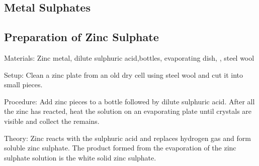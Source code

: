 \begin{multicols}{2}



\section*{Metal Sulphates}


\subsection{Preparation of Zinc Sulphate}


\begin{description*}
\item[Materials:]{Zinc metal, dilute sulphuric acid,bottles, evaporating dish, , steel wool}
\item[Setup:]{Clean a zinc plate from an old dry cell using steel wool and cut it into small pieces.}
\item[Procedure:]{Add zinc pieces to a bottle followed by dilute sulphuric acid. After all the zinc has reacted, heat the solution on an evaporating plate until crystals are visible and collect the remains.}
\item[Theory:]{Zinc reacts with the sulphuric acid and replaces hydrogen gas and form soluble zinc sulphate. The product formed from the evaporation of the zinc
sulphate solution is the white solid zinc sulphate.}
\end{description*}


\end{multicols}

\pagebreak